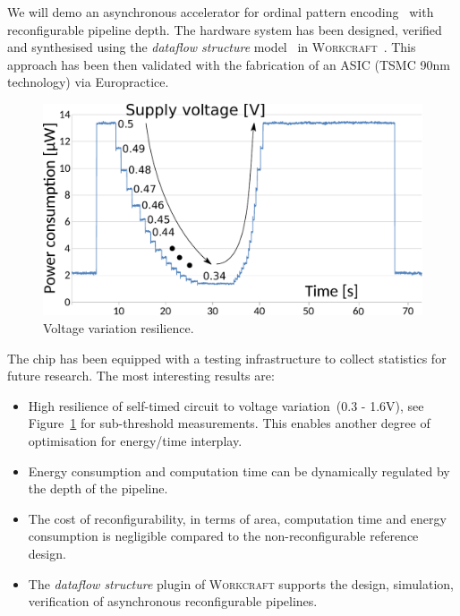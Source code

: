 \documentclass[conference]{IEEEtran}
\begin{document}
We will demo an asynchronous accelerator for ordinal pattern encoding~\cite{OPE} with
reconfigurable pipeline depth. The hardware system has been designed, verified and synthesised
using the \emph{dataflow structure} model~\cite{DFS} in \textsc{Workcraft}~\cite{workcraft_web}. This approach has been
then validated with the fabrication of an ASIC (TSMC 90nm technology) via
Europractice.

\begin{figure}[ht!]
\begin{center}
	\includegraphics[width=\linewidth]{FIG/voltage-var.pdf}
	\caption{Voltage variation resilience.}
	\label{fig:voltage-var}
\end{center}
\end{figure}

\noindent
The chip has been equipped with a testing infrastructure to collect statistics for future research. The most interesting results are: 
\begin{itemize}
\item High resilience of self-timed circuit to voltage variation~(0.3 - 1.6V), see Figure~\ref{fig:voltage-var} for sub-threshold measurements. This enables another degree of optimisation for energy/time interplay.
\item Energy consumption and computation time can be dynamically regulated by the depth of the pipeline.
\item The cost of reconfigurability, in terms of area, computation time and energy consumption is negligible compared to the non-reconfigurable reference design.
\item The \emph{dataflow structure} plugin of \textsc{Workcraft} supports the design, simulation, verification of asynchronous reconfigurable pipelines.
\end{itemize}
\end{document}
